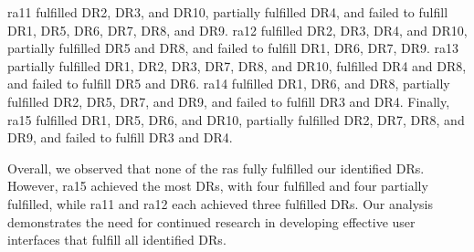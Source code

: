 \ac{ra}11 fulfilled DR2, DR3, and DR10, partially fulfilled DR4, and failed to fulfill DR1, DR5, DR6, DR7, DR8, and DR9. 
\ac{ra}12 fulfilled DR2, DR3, DR4, and DR10, partially fulfilled DR5 and DR8, and failed to fulfill DR1, DR6, DR7, DR9. 
\ac{ra}13 partially fulfilled DR1, DR2, DR3, DR7, DR8, and DR10, fulfilled DR4 and DR8, and failed to fulfill DR5 and DR6. 
\ac{ra}14 fulfilled DR1, DR6, and DR8, partially fulfilled DR2, DR5, DR7, and DR9, and failed to fulfill DR3 and DR4. 
Finally, \ac{ra}15 fulfilled DR1, DR5, DR6, and DR10, partially fulfilled DR2, DR7, DR8, and DR9, and failed to fulfill DR3 and DR4.

Overall, we observed that none of the \ac{ra}s fully fulfilled our identified DRs. 
However, \ac{ra}15 achieved the most DRs, with four fulfilled and four partially fulfilled, while \ac{ra}11 and \ac{ra}12 each achieved three fulfilled DRs. 
Our analysis demonstrates the need for continued research in developing effective user interfaces that fulfill all identified DRs.